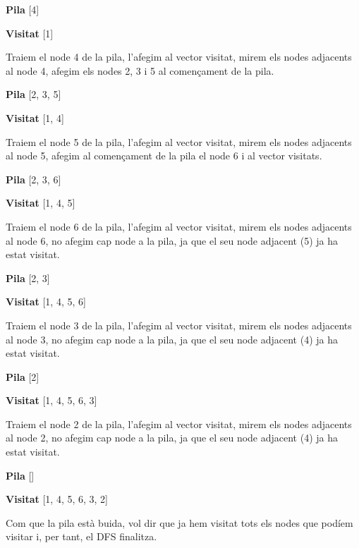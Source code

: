 \textbf{Pila} [4]

\textbf{Visitat} [1] \newline

Traiem el node 4 de la pila, l'afegim al vector visitat, mirem els nodes adjacents al node 4, afegim els nodes 2, 3 i 5 al començament de la pila. \newline

\textbf{Pila} [2, 3, 5]

\textbf{Visitat} [1, 4] \newline

Traiem el node 5 de la pila, l'afegim al vector visitat, mirem els nodes adjacents al node 5, afegim al començament de la pila el node 6 i al vector visitats. \newline

\textbf{Pila} [2, 3, 6]

\textbf{Visitat} [1, 4, 5] \newline

Traiem el node 6 de la pila, l'afegim al vector visitat, mirem els nodes adjacents al node 6, no afegim cap node a la pila, ja que el seu node adjacent (5) ja ha estat visitat. \newline

\textbf{Pila} [2, 3]

\textbf{Visitat} [1, 4, 5, 6] \newline

Traiem el node 3 de la pila, l'afegim al vector visitat, mirem els nodes adjacents al node 3, no afegim cap node a la pila, ja que el seu node adjacent (4) ja ha estat visitat. \newline

\textbf{Pila} [2]

\textbf{Visitat} [1, 4, 5, 6, 3] \newline

Traiem el node 2 de la pila, l'afegim al vector visitat, mirem els nodes adjacents al node 2, no afegim cap node a la pila, ja que el seu node adjacent (4) ja ha estat visitat. \newline

\textbf{Pila} []

\textbf{Visitat} [1, 4, 5, 6, 3, 2] \newline

Com que la pila està buida, vol dir que ja hem visitat tots els nodes que podíem visitar i, per tant, el DFS finalitza.

